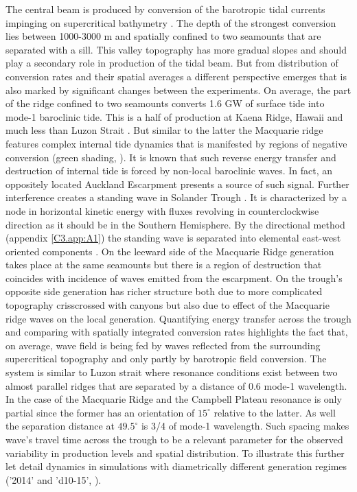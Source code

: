 \documentclass[12pt]{article}
\begin{document}
The central beam is produced by conversion of the barotropic tidal currents impinging on 
supercritical bathymetry . The depth of the strongest conversion lies between 
1000-3000 m and spatially 
confined 
to two seamounts that are separated with a sill. This valley topography has more gradual slopes and 
should play 
a secondary role in production of the tidal beam. But from distribution of conversion rates 
 and their spatial averages  a different perspective 
emerges that is also marked by significant changes between the experiments. On average, 
the part of the ridge confined to two seamounts converts 1.6 GW of surface tide into mode-1 
baroclinic tide. This is a half of production at Kaena Ridge, 
Hawaii 
\citep{carter2008energetics} and much less than Luzon Strait \citep{}. But similar to the latter 
the Macquarie ridge features complex internal tide dynamics that is manifested by regions of 
negative conversion (green shading, ). It is known \citep{Kelly2010a} 
that such reverse energy transfer and destruction of internal tide is forced by non-local 
baroclinic 
waves. In fact, an oppositely located Auckland Escarpment presents a source of such signal. Further 
interference creates a standing wave in Solander Trough . It is 
characterized by a node in horizontal kinetic energy with fluxes revolving in counterclockwise 
direction  as it should be in the Southern Hemisphere. By the directional 
method (appendix \ref{C3.app:A1}) the standing wave is separated into elemental east-west oriented 
components . On the leeward side of the Macquarie Ridge generation 
takes place at the same seamounts but there is a region of destruction that coincides with 
incidence of waves emitted from the escarpment. On the trough's opposite side generation has 
richer structure both due to more complicated topography crisscrossed with canyons but also due to 
effect of the Macquarie ridge waves on the local generation. Quantifying energy transfer across the 
trough 
and comparing with spatially integrated conversion rates  highlights 
the fact that, on average, wave field is 
being fed by waves reflected from the surrounding supercritical topography and only partly by 
barotropic field conversion. The 
system is similar to Luzon strait where resonance conditions exist between two almost parallel 
ridges \citep{buijsman2014three} that are separated by a distance of 0.6 mode-1 wavelength. In 
the case of the Macquarie Ridge and the Campbell Plateau resonance is only partial since the former 
has an orientation of $15^{\circ}$ relative to the latter. As well the separation distance at 
$49.5^{\circ}$ is 3/4 of mode-1 wavelength. Such spacing makes wave's travel time across the 
trough to be a relevant parameter for the observed variability in production levels and spatial 
distribution. To illustrate this further let detail dynamics in simulations 
with diametrically different generation regimes ('2014' and 'd10-15', ).\\
\end{document}
